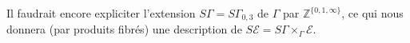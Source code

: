 Il faudrait encore expliciter l'extension $S\Gamma=S\Gamma_{0,3}$ de $\Gamma$ par $\mathbb Z^{\{0,1,\infty\}}$, ce qui nous donnera (par produits fibrés) une description de $S\mathcal E=S\Gamma\times_\Gamma\mathcal E$.
